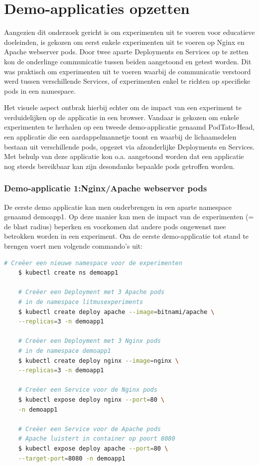 \section{Demo-applicaties opzetten}

 Aangezien dit onderzoek gericht is om experimenten uit te voeren voor educatieve doeleinden, is gekozen om eerst enkele experimenten uit te voeren op Nginx en Apache webserver pods. Door twee aparte Deployments en Services op te zetten kon de onderlinge communicatie tussen beiden aangetoond en getest worden. Dit was praktisch om experimenten uit te voeren waarbij de communicatie verstoord werd tussen verschillende Services, of experimenten enkel te richten op specifieke pods in een namespace. 

Het visuele aspect ontbrak hierbij echter om de impact van een experiment te verduidelijken op de applicatie in een browser. Vandaar is gekozen om enkele experimenten te herhalen op een tweede demo-applicatie genaamd PodTato-Head, een applicatie die een aardappelmannetje toont en waarbij de lichaamsdelen bestaan uit verschillende pods, opgezet via afzonderlijke Deployments en Services.   Met behulp van deze applicatie kon o.a. aangetoond worden dat een applicatie nog steeds bereikbaar kan zijn desondanks bepaalde pods getroffen worden.

\subsubsection{Demo-applicatie 1:Nginx/Apache webserver pods}

De eerste demo applicatie kan men onderbrengen in een aparte namespace genaamd demoapp1. Op deze manier kan men de impact van de experimenten (= de blast radius) beperken en voorkomen dat andere pods ongewenst mee betrokken worden in een experiment. Om de eerste demo-applicatie tot stand te brengen voert men volgende commando's uit: 
\begin{lstlisting}[language=bash]
    # Creëer een nieuwe namespace voor de experimenten
    $ kubectl create ns demoapp1
    
    # Creëer een Deployment met 3 Apache pods
    # in de namespace litmusexperiments
    $ kubectl create deploy apache --image=bitnami/apache \
    --replicas=3 -n demoapp1
    
    # Creëer een Deployment met 3 Nginx pods 
    # in de namespace demoapp1
    $ kubectl create deploy nginx --image=nginx \
    --replicas=3 -n demoapp1
    
    # Creëer een Service voor de Nginx pods
    $ kubectl expose deploy nginx --port=80 \
    -n demoapp1
    
    # Creëer een Service voor de Apache pods
    # Apache luistert in container op poort 8080
    $ kubectl expose deploy apache --port=80 \
    --target-port=8080 -n demoapp1           
\end{lstlisting} 

